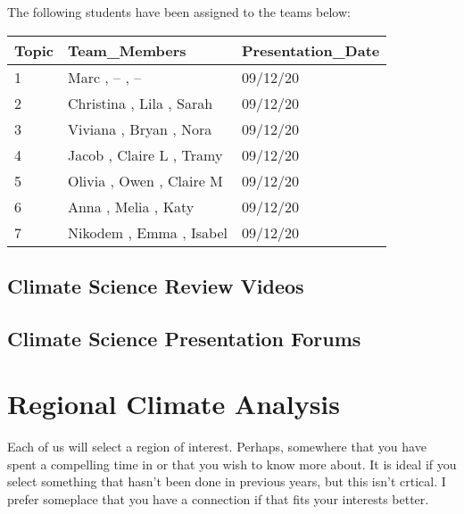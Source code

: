 \documentclass{article}\usepackage[]{graphicx}\usepackage[]{color}
\begin{document}
{\color{red}The following students have been assigned to the teams below:

\begin{table}[ht]
\centering
\begin{tabular}{lll}
  \hline
Topic & Team\_Members & Presentation\_Date \\ 
  \hline
1 & Marc ,  -- ,  -- & 09/12/20 \\ 
  2 & Christina ,  Lila ,  Sarah & 09/12/20 \\ 
  3 & Viviana ,  Bryan ,  Nora & 09/12/20 \\ 
  4 & Jacob ,  Claire L ,  Tramy & 09/12/20 \\ 
  5 & Olivia ,  Owen ,  Claire M & 09/12/20 \\ 
  6 & Anna ,  Melia ,  Katy & 09/12/20 \\ 
  7 & Nikodem ,  Emma ,  Isabel & 09/12/20 \\ 
   \hline
\end{tabular}
\end{table}

}
\subsection{Climate Science Review {\color{red}Videos}}




%

\subsection{Climate Science Presentation Forums}



\section{Regional Climate Analysis}

Each of us will select a region of interest. Perhaps, somewhere that you have spent a compelling time in or that you wish to know more about. It is ideal if you select something that hasn't been done in previous years, but this isn't crtical. I prefer someplace that you have a connection if that fits your interests better. %
\end{document}
